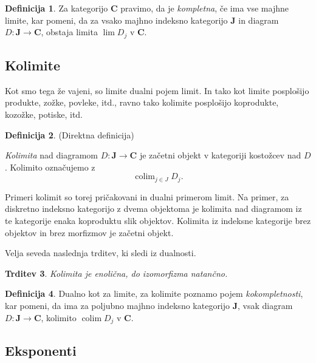 \documentclass[12pt,a4paper]{book}
\theoremstyle{definition}
\newtheorem{definicija}{Definicija}[chapter]
\theoremstyle{plain}
\newtheorem{trditev}[definicija]{Trditev}
\theoremstyle{definition}
\theoremstyle{remark}
\newcommand{\cat}[1]{\textbf{#1}}
\DeclareMathOperator{\colim}{colim}
\begin{document}
\begin{definicija}
Za kategorijo $\cat{C}$ pravimo, da je \emph{kompletna}, če ima vse majhne limite, kar pomeni, da za vsako majhno indeksno kategorijo $\cat{J}$ in diagram $D : \cat{J} \to \cat{C}$, obstaja limita $\lim D_j$ v $\cat{C}$.
\end{definicija}



\subsection{Kolimite}

Kot smo tega že vajeni, so limite dualni pojem limit. In tako kot limite posplošijo produkte, zožke, povleke, itd., ravno tako kolimite posplošijo koprodukte, kozožke, potiske, itd.

\begin{definicija} (Direktna definicija)

\emph{Kolimita} nad diagramom $D : \cat{J} \to \cat{C}$ je začetni objekt v kategoriji kostožcev nad $D$. Kolimito označujemo z
$$\colim_{j \in J} D_j.$$
\end{definicija}

Primeri kolimit so torej pričakovani in dualni primerom limit. Na primer, za diskretno indeksno kategorijo z dvema objektoma je kolimita nad diagramom iz te kategorije enaka koproduktu slik objektov. Kolimita iz indeksne kategorije brez objektov in brez morfizmov je začetni objekt.


Velja seveda naslednja trditev, ki sledi iz dualnosti.

\begin{trditev}
Kolimita je enolična, do izomorfizma natančno.
\end{trditev}

\begin{definicija}
Dualno kot za limite, za kolimite poznamo pojem \emph{kokompletnosti}, kar pomeni, da ima za poljubno majhno indeksno kategorijo $\cat{J}$, vsak diagram $D : \cat{J} \to \cat{C}$, kolimito $\colim D_j$ v $\cat{C}$.
\end{definicija}

\subsection{Eksponenti}
\end{document}
